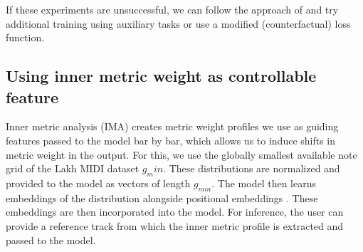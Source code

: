 If these experiments are unsuccessful, we can follow the approach of \cite{Shu_Xu_Musebarcontrol_2024} and try additional training using auxiliary tasks or use a modified (counterfactual) loss function. 

\subsection{Using inner metric weight as controllable feature}
Inner metric analysis (IMA) creates metric weight profiles we use as guiding features passed to the model bar by bar, which allows us to induce shifts in metric weight in the output. 
For this, we use the globally smallest available note grid of the Lakh MIDI dataset $g_min$. These distributions are normalized and provided to the model as vectors of length $g_{min}$.
The model then learns embeddings of the distribution alongside positional embeddings \cite{Lin_cocomulla_2024}. These embeddings are then incorporated into the model. For inference, the user can provide a reference track from which the inner metric profile is extracted and passed to the model. 
